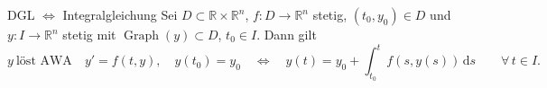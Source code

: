 \begin{satz}{DGL $\Leftrightarrow$ Integralgleichung}
    Sei $D\subset\mathbb{R}\times\mathbb{R}^n$, $f\colon D\to\mathbb{R}^n$ stetig, $(t_0,y_0)\in D$ und $y\colon I\to\mathbb{R}^n$ stetig mit $\operatorname{Graph}(y)\subset D$, $t_0\in I$. Dann gilt
    $$
    y\ \text{löst AWA}\quad y'=f(t,y),\quad y(t_0)=y_0
    \quad\Longleftrightarrow\quad
    y(t)=y_0+\int_{t_0}^{t} f(s,y(s))\,\mathrm{d}s\qquad\forall\,t\in I.
    $$   
\end{satz}